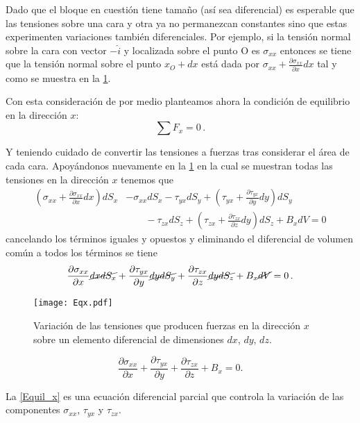 \documentclass[../notas medios.tex]{subfiles}
\begin{document}
Dado que el bloque en cuestión tiene tamaño (así sea diferencial) es esperable que las tensiones sobre una cara y otra ya no permanezcan constantes sino que estas experimenten variaciones también diferenciales. Por ejemplo, si la tensión normal sobre la cara con vector $-\hat{i}$ y localizada sobre el punto O es ${\sigma _{xx}}$ entonces se tiene que la tensión normal sobre el punto $x_O+dx$ está dada por ${\sigma _{xx}} + \frac{{\partial {\sigma _{xx}}}}{{\partial x}}dx$ tal y como se muestra en la \cref{EQx}.


Con esta consideración de por medio planteamos ahora la condición de equilibrio en la dirección $x$:
\[\sum F_x = 0\, . \]

Y teniendo cuidado de convertir las tensiones a fuerzas tras considerar el área de cada cara. Apoyándonos nuevamente en la \cref{EQx} en la cual se muestran todas las tensiones en la dirección $x$ tenemos que
\begin{align*}
\left( \sigma_{xx} + \frac{\partial \sigma_{xx}}{\partial x}dx \right)d{S_x} & - {\sigma _{xx}}d{S_x} - {\tau _{yx}}d{S_y} + \left( {{\tau _{yx}} + \frac{{\partial {\tau _{yx}}}}{{\partial y}}dy} \right)d{S_y} \nonumber \\ 
&\qquad {} - {\tau _{zx}}d{S_z} + \left( {{\tau _{zx}} + \frac{{\partial {\tau _{zx}}}}{{\partial z}}dy} \right)d{S_z} + {B_x}dV = 0
\end{align*}
cancelando los términos iguales y opuestos y eliminando el diferencial de volumen común a todos los términos se tiene
\[\frac{{\partial {\sigma _{xx}}}}{{\partial x}}\cancel{dxd{S_x}} + \frac{{\partial {\tau _{yx}}}}{{\partial y}}\cancel{dyd{S_y}} + \frac{{\partial {\tau _{zx}}}}{{\partial z}}\cancel{dyd{S_z}} + {B_x}\cancel{dV} = 0\, .\]

\begin{figure}[h]
\centering
	\texttt{[image: Eqx.pdf]}
	\caption{Variación de las tensiones que producen fuerzas en la dirección $x$ sobre un elemento diferencial de dimensiones $dx$, $dy$, $dz$.}
	\label{EQx}
\end{figure}


\begin{equation}
\frac{{\partial {\sigma _{xx}}}}{{\partial x}} + \frac{{\partial {\tau _{yx}}}}{{\partial y}} + \frac{{\partial {\tau _{zx}}}}{{\partial z}} + {B_x} = 0.
\label{Equil_x}
\end{equation}

La \cref{Equil_x} es una ecuación diferencial parcial que controla la variación de las componentes $\sigma_{xx}$, $\tau_{yx}$ y $\tau_{zx}$.
\end{document}

